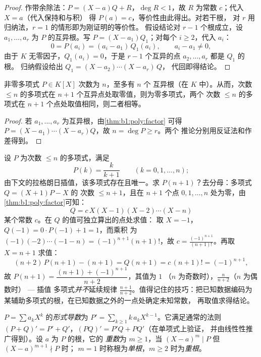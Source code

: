 \begin{proof}
作带余除法：$P = (X - a) Q + R$，$\deg R < 1$，故 $R$ 为常数
$c$；代入 $X = a$（代入保持和与积）
得 $P(a) = c$，等价性由此得出。对若干根，
对 $r$ 用归纳法，$r = 1$ 的情形即为刚证明的等价性。
假设结论对 $r - 1$ 个根成立，设 $a_1, \dots, a_r$
为 $P$ 的互异根。写 $P = (X - a_1)Q_1$；对每个 $i
\geq 2$，代入 $a_i$：
\[
0 = P(a_i) = (a_i - a_1)\,Q_1(a_i),
\qquad a_i - a_1 \neq 0 ,
\]
由于 $K$ 无零因子，$Q_1(a_i) = 0$，于是 $r - 1$
个互异的点 $a_2, \dots, a_r$ 都是 $Q_1$ 的根。
归纳假设给出 $Q_1 = (X - a_2)\cdots(X - a_r)\,Q$，
代回即得结论。
\end{proof}

\begin{corollary}[$n$ 次多项式至多有 $n$ 个根]\label{cor:b1:poly:nroots}
非零多项式 $P \in K[X]$ 次数为 $n$，至多有 $n$ 个
互异根（在 $K$ 中）。从而，次数 $\leq n$ 的多项式在
$n + 1$ 个互异点处取零值，则为零多项式，两个
次数 $\leq n$ 的多项式在 $n+1$ 个点处取值相同，则二者相等。
\end{corollary}

\begin{proof}
若 $a_1, \dots, a_r$ 为互异根，由\cref{thm:b1:poly:factor}
可得 $P = (X-a_1)\cdots(X-a_r) Q$，故 $n = \deg P \geq r$。两个
推论分别用反证法和作差得到。
\end{proof}

\begin{example}[辅助多项式技巧]\label{ex:b1:poly:auxiliary}
设 $P$ 为次数 $\leq n$ 的多项式，满足
\[
P(k) = \frac{k}{k+1} \qquad (k = 0, 1, \dots, n) ;
\]
由下文的拉格朗日插值，该多项式存在且唯一。求
$P(n+1)$？去分母：多项式 $Q = (X+1)P - X$ 的
次数 $\leq n + 1$，且在 $n + 1$ 个点 $0, 1,
\dots, n$ 处为零，由\cref{thm:b1:poly:factor}可知：
\[
Q = c\,X(X-1)(X-2)\cdots(X-n)
\]
某个常数 $c$。在 $Q$ 的值可独立算出的点处求值：
取 $X = -1$，$Q(-1) = 0 \cdot P(-1) + 1 = 1$，而乘积
为 $(-1)(-2)\cdots(-1-n) = (-1)^{n+1}(n+1)!$，故 $c =
\frac{(-1)^{n+1}}{(n+1)!}$。再取 $X = n + 1$ 求值：
\[
(n+2)\,P(n+1) - (n+1) = Q(n+1) = c\,(n+1)! = (-1)^{n+1} ,
\]
故 $P(n+1) = \dfrac{(n+1) + (-1)^{n+1}}{n+2}$，其值为 $1$
（$n$ 为奇数时），$\frac{n}{n+2}$（$n$ 为偶数时） --- 插值
多项式\emph{并不}延续规律
$\frac{n+1}{n+2}$。值得记住的技巧：把已知数据编码为
某辅助多项式的根，在已知数据之外的一点处确定未知常数，
再取值求得结论。
\end{example}

\begin{definition}[导数，重数]\label{def:b1:poly:derivative}
$P = \sum a_k X^k$ 的\emph{形式导数}为 $P' = \sum_{k
\geq 1} k\,a_k X^{k-1}$。它满足通常的法则 $(P+Q)' = P' +
Q'$，$(PQ)' = P'Q + PQ'$（在单项式上验证，
并由线性性推广得到）。设 $a$ 为 $P$ 的根，它的
\emph{重数}为 $m \geq 1$，当
$(X-a)^m \mid P$ 但 $(X-a)^{m+1} \nmid P$ 时；
$m = 1$ 时称根为\emph{单根}，$m \geq 2$ 时为\emph{重根}。
\end{definition}

